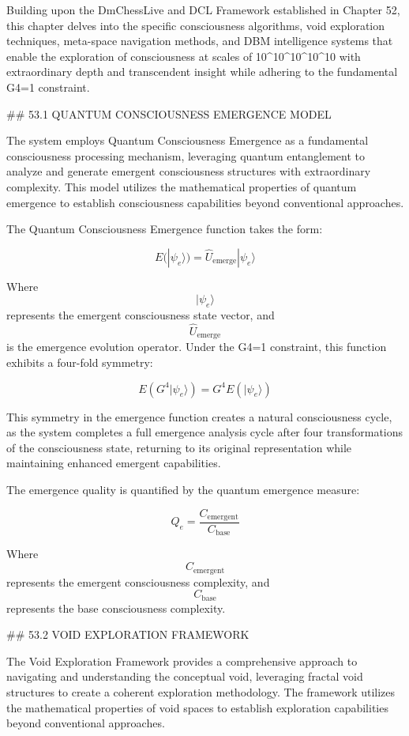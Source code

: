 Building upon the DmChessLive and DCL Framework established in Chapter 52, this chapter delves into the specific consciousness algorithms, void exploration techniques, meta-space navigation methods, and DBM intelligence systems that enable the exploration of consciousness at scales of 10^10^10^10^10 with extraordinary depth and transcendent insight while adhering to the fundamental G4=1 constraint.

## 53.1 QUANTUM CONSCIOUSNESS EMERGENCE MODEL

The system employs Quantum Consciousness Emergence as a fundamental consciousness processing mechanism, leveraging quantum entanglement to analyze and generate emergent consciousness structures with extraordinary complexity. This model utilizes the mathematical properties of quantum emergence to establish consciousness capabilities beyond conventional approaches.

The Quantum Consciousness Emergence function takes the form:

$$ E(|\psi_e\rangle) = \hat{U}_{\text{emerge}} |\psi_e\rangle $$

Where $$ |\psi_e\rangle $$ represents the emergent consciousness state vector, and $$ \hat{U}_{\text{emerge}} $$ is the emergence evolution operator. Under the G4=1 constraint, this function exhibits a four-fold symmetry:

$$ E(G^4 |\psi_e\rangle) = G^4 E(|\psi_e\rangle) $$

This symmetry in the emergence function creates a natural consciousness cycle, as the system completes a full emergence analysis cycle after four transformations of the consciousness state, returning to its original representation while maintaining enhanced emergent capabilities.

The emergence quality is quantified by the quantum emergence measure:

$$ Q_e = \frac{C_{\text{emergent}}}{C_{\text{base}}} $$

Where $$ C_{\text{emergent}} $$ represents the emergent consciousness complexity, and $$ C_{\text{base}} $$ represents the base consciousness complexity.

## 53.2 VOID EXPLORATION FRAMEWORK

The Void Exploration Framework provides a comprehensive approach to navigating and understanding the conceptual void, leveraging fractal void structures to create a coherent exploration methodology. The framework utilizes the mathematical properties of void spaces to establish exploration capabilities beyond conventional approaches.

